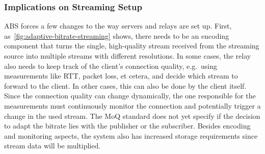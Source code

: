 \subsubsection{Implications on Streaming Setup}
ABS forces a few changes to the way servers and relays are set up.
First, as~\autoref{fig:adaptive-bitrate-streaming} shows, there needs to 
be an encoding component that turns the single, high-quality stream  
received from the streaming source into multiple streams with different resolutions.
In some cases, the relay also needs to keep track of the client's connection quality, e.g.~using 
measurements like RTT, packet loss, et cetera, and decide which stream to forward to the client.
In other cases, this can also be done by the client itself.
Since the connection quality can change dynamically, the one responsible for
the measurements must continuously monitor the connection and potentially trigger a change in 
the used stream.
The MoQ standard does not yet specify if the decision to adapt the bitrate lies with the
publisher or the subscriber.
Besides encoding and monitoring aspects, the system also has increased storage requirements
since stream data will be multiplied.

